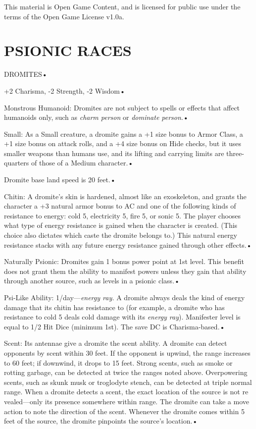 \documentclass{article}
\begin{document}
This material is Open Game Content, and is licensed for public use under the terms 
of the Open Game License v1.0a.

\section*{{\LARGE{}PSIONIC RACES}}

\vspace{12pt}
{\LARGE{}DROMITES• }

\parindent=3pt
+2 Charisma, -2 Strength, -2 Wisdom• 

Monstrous Humanoid: Dromites are not subject to spells or effects that affect humanoids 
only, such as \textit{charm person }or \textit{dominate person}.• 

Small: As a Small creature, a dromite gains a +1 size bonus to Armor Class, a +1 
size bonus on attack rolls, and a +4 size bonus on Hide checks, but it uses smaller 
weapons than humans use, and its lifting and carrying limits are three-quarters 
of those of a Medium character.• 

\parindent=7pt
Dromite base land speed is 20 feet.• 

\parindent=3pt
Chitin: A dromite's skin is hardened, almost like an exoskeleton, and grants the 
character a +3 natural armor bonus to AC and one of the following kinds of resistance 
to energy: cold 5, electricity 5, fire 5, or sonic 5. The player chooses what type 
of energy resistance is gained when the character is created. (This choice also 
dictates which caste the dromite belongs to.) This natural energy resistance stacks 
with any future energy resistance gained through other effects.• 

Naturally Psionic: Dromites gain 1 bonus power point at 1st level. This benefit 
does not grant them the ability to manifest powers unless they gain that ability 
through another source, such as levels in a psionic class.• 

\parindent=7pt
Psi-Like Ability: 1/day---\textit{energy ray. }A dromite always deals the kind 
of energy damage that its chitin has resistance to (for example, a dromite who 
has resistance to cold 5 deals cold damage with its \textit{energy ray}). Manifester 
level is equal to 1/2 Hit Dice (minimum 1st). The save DC is Charisma-based.• 

\parindent=3pt
Scent: Its antennae give a dromite the scent ability. A dromite can detect opponents 
by scent within 30 feet. If the opponent is upwind, the range increases to 60 feet; 
if downwind, it drops to 15 feet. Strong scents, such as smoke or rotting garbage, 
can be detected at twice the ranges noted above. Overpowering scents, such as skunk 
musk or troglodyte stench, can be detected at triple normal range. When a dromite 
detects a scent, the exact location of the source is not re vealed---only its presence 
somewhere within range. The dromite can take a move action to note the direction 
of the scent. Whenever the dromite comes within 5 feet of the source, the dromite 
pinpoints the source's location.• 
\end{document}
